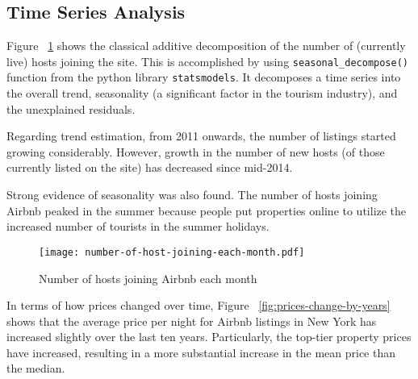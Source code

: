 \subsection{Time Series Analysis}
\label{sec:time_series}



Figure ~\ref{fig:number_of_hosts_joining} shows the classical additive
decomposition of the number of (currently live) hosts joining the site.  This is
accomplished by using \texttt{seasonal\_decompose()} function from the python
library \texttt{statsmodels}. It decomposes a time series into the overall trend,
seasonality (a significant factor in the tourism industry), and the unexplained
residuals.

Regarding trend estimation, from 2011 onwards, the number of listings started
growing considerably. However, growth in the number of new hosts (of those
currently listed on the site) has decreased since mid-2014.

Strong evidence of seasonality was also found. The number of hosts joining
Airbnb peaked in the summer because people put properties online to utilize the
increased number of tourists in the summer holidays.

\begin{figure}[!htbp]
  \centering
    \texttt{[image: number-of-host-joining-each-month.pdf]}
    \caption{Number of hosts joining Airbnb each month}
    \label{fig:number_of_hosts_joining}
\end{figure}

In terms of how prices changed over time, Figure
~\ref{fig:prices-change-by-years} shows that the average price per night for
Airbnb listings in New York has increased slightly over the
last ten years. Particularly, the top-tier property prices have increased,
resulting in a more substantial increase in the mean price than the median.


